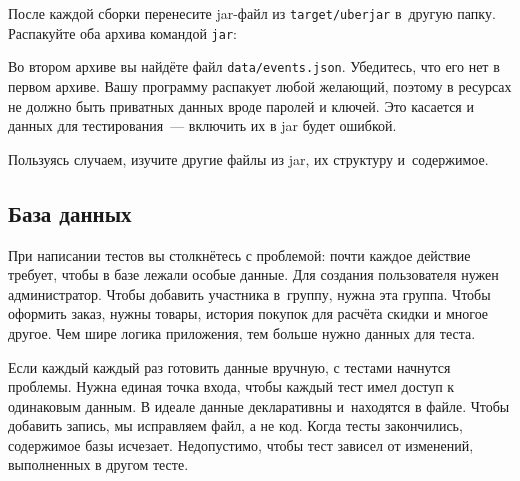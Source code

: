\ifnarrow

\begin{english}
  \begin{clojure}
:profiles
  {:uberjar {:resource-paths
             ["env/test/resources"]}
  \end{clojure}
\end{english}

\else

\begin{english}
  \begin{clojure}
:profiles {:uberjar {:resource-paths ["env/test/resources"]}
  \end{clojure}
\end{english}

\fi

После каждой сборки перенесите jar-файл из \verb|target/uberjar| в~другую
папку. Распакуйте оба архива командой \verb|jar|:

\begin{english}
\end{english}

Во втором архиве вы найдёте файл \verb|data/events.json|. Убедитесь, что его нет
в первом архиве. Вашу программу распакует любой желающий, поэтому в ресурсах не
должно быть приватных данных вроде паролей и ключей. Это касается и данных для
тестирования~--- включить их в jar будет ошибкой.

Пользуясь случаем, изучите другие файлы из jar, их структуру и~содержимое.

\subsection{База данных}


При написании тестов вы столкнётесь с проблемой: почти каждое действие требует,
чтобы в базе лежали особые данные. Для создания пользователя нужен
администратор. Чтобы добавить участника в~группу, нужна эта группа. Чтобы
оформить заказ, нужны товары, история покупок для расчёта скидки и многое
другое. Чем шире логика приложения, тем больше нужно данных для теста.

Если каждый каждый раз готовить данные вручную, с тестами начнутся
проблемы. Нужна единая точка входа, чтобы каждый тест имел доступ к одинаковым
данным. В идеале данные декларативны и~находятся в файле. Чтобы добавить запись,
мы исправляем файл, а не код. Когда тесты закончились, содержимое базы
исчезает. Недопустимо, чтобы тест зависел от изменений, выполненных в другом
тесте.

